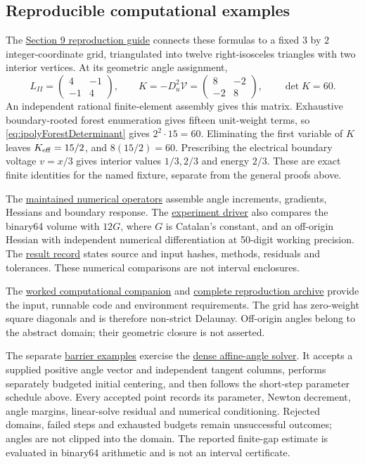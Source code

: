 \subsection{Reproducible computational examples}
\label{subsec:ipolyComputation}

The \href{../experiments/section9/README.md}{Section 9 reproduction guide}
connects these formulas to a fixed $3$ by $2$ integer-coordinate grid,
triangulated into twelve right-isosceles triangles with two interior
vertices. At its geometric angle assignment,
\[
 L_{II}=\begin{pmatrix}4&-1\\-1&4\end{pmatrix},\qquad
 K=-D_u^2\mathcal V=\begin{pmatrix}8&-2\\-2&8\end{pmatrix},\qquad
 \det K=60.
\]
An independent rational finite-element assembly gives this matrix.
Exhaustive boundary-rooted forest enumeration gives fifteen unit-weight
terms, so \eqref{eq:ipolyForestDeterminant} gives $2^2\cdot15=60$.
Eliminating the first variable of $K$ leaves $K_{\rm eff}=15/2$, and
$8(15/2)=60$. Prescribing the electrical boundary voltage $v=x/3$
gives interior values $1/3,2/3$ and energy $2/3$. These are exact finite
identities for the named fixture, separate from the general proofs above.

The \href{../packages/volume-toolkit/ideal_poly_volume_toolkit/variational.py}
{maintained numerical operators} assemble angle increments, gradients,
Hessians and boundary response. The
\href{../experiments/section9/run.py}{experiment driver} also compares
the binary64 volume with $12G$, where $G$ is Catalan's constant, and an
off-origin Hessian with independent numerical differentiation at 50-digit
working precision. The \href{../artifacts/section9/result.json}{result record}
states source and input hashes, methods, residuals and tolerances.
These numerical comparisons are not interval enclosures.

The \href{../site/section9/index.html}{worked computational companion}
and \href{../site/section9/downloads/section9-reproduction.zip}{complete
reproduction archive} provide the input, runnable code and environment
requirements. The grid has zero-weight square diagonals and is therefore
non-strict Delaunay. Off-origin angles belong to the abstract domain;
their geometric closure is not asserted.

The separate \href{../site/section9/barrier.html}{barrier examples} exercise
the \href{../packages/volume-toolkit/ideal_poly_volume_toolkit/angle_barrier.py}
{dense affine-angle solver}. It accepts a supplied positive angle vector
and independent tangent columns, performs separately budgeted initial
centering, and then follows the short-step parameter schedule above.
Every accepted point records its parameter, Newton decrement, angle margins,
linear-solve residual and numerical conditioning. Rejected domains, failed
steps and exhausted budgets remain unsuccessful outcomes; angles are not
clipped into the domain. The reported finite-gap estimate is evaluated in
binary64 arithmetic and is not an interval certificate.

